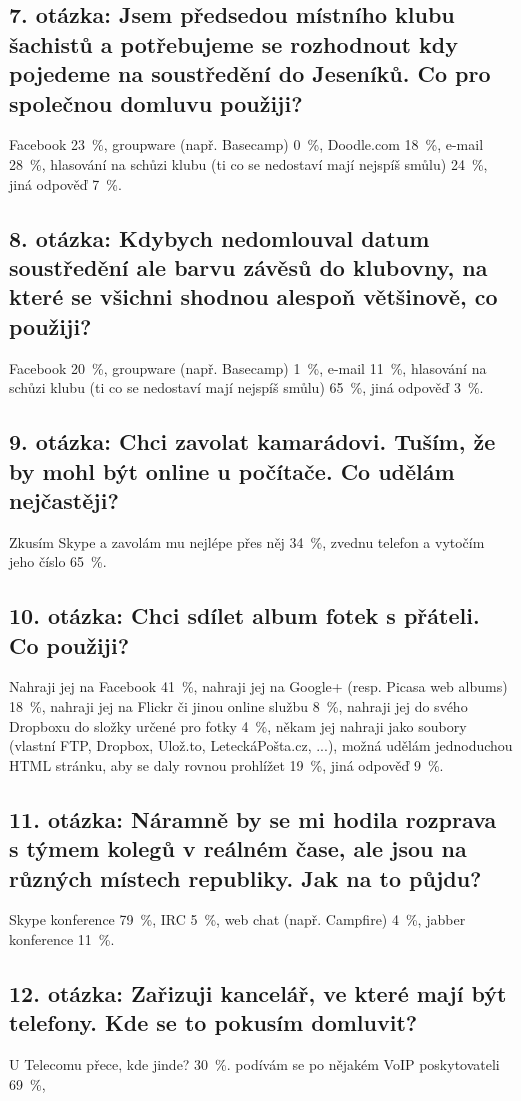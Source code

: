 \documentclass[12pt,oneside,final]{fithesis2}
\begin{document}
\subsection*{7. otázka: Jsem předsedou místního klubu šachistů a potřebujeme se rozhodnout kdy pojedeme na soustředění do Jeseníků. Co pro společnou domluvu použiji?}
Facebook 23~\%,
groupware (např. Basecamp) 0~\%,
Doodle.com 18~\%,
e-mail 28~\%,
hlasování na schůzi klubu (ti co se nedostaví mají nejspíš smůlu) 24~\%,
jiná odpověď 7~\%.

\subsection*{8. otázka: Kdybych nedomlouval datum soustředění ale barvu závěsů do klubovny, na které se všichni shodnou alespoň většinově, co použiji?}
Facebook 20~\%,
groupware (např. Basecamp) 1~\%,
e-mail 11~\%,
hlasování na schůzi klubu (ti co se nedostaví mají nejspíš smůlu) 65~\%,
jiná odpověď 3~\%.

\subsection*{9. otázka: Chci zavolat kamarádovi. Tuším, že by mohl být online u počítače. Co udělám nejčastěji?}
Zkusím Skype a zavolám mu nejlépe přes něj 34~\%,
zvednu telefon a vytočím jeho číslo 65~\%.

\subsection*{10. otázka: Chci sdílet album fotek s přáteli. Co použiji?}
Nahraji jej na Facebook 41~\%,
nahraji jej na Google+ (resp. Picasa web albums) 18~\%,
nahraji jej na Flickr či jinou online službu 8~\%,
nahraji jej do svého Dropboxu do složky určené pro fotky 4~\%,
někam jej nahraji jako soubory (vlastní FTP, Dropbox, Ulož.to, LeteckáPošta.cz, ...), možná udělám jednoduchou HTML stránku, aby se daly rovnou prohlížet 19~\%,
jiná odpověď 9~\%.

\subsection*{11. otázka: Náramně by se mi hodila rozprava s týmem kolegů v reálném čase, ale jsou na různých místech republiky. Jak na to půjdu?}
Skype konference 79~\%,
IRC 5~\%,
web chat (např. Campfire) 4~\%,
jabber konference 11~\%.

\subsection*{12. otázka: Zařizuji kancelář, ve které mají být telefony. Kde se to pokusím domluvit?}
U Telecomu přece, kde jinde? 30~\%.
podívám se po nějakém VoIP poskytovateli 69~\%,
\end{document}
